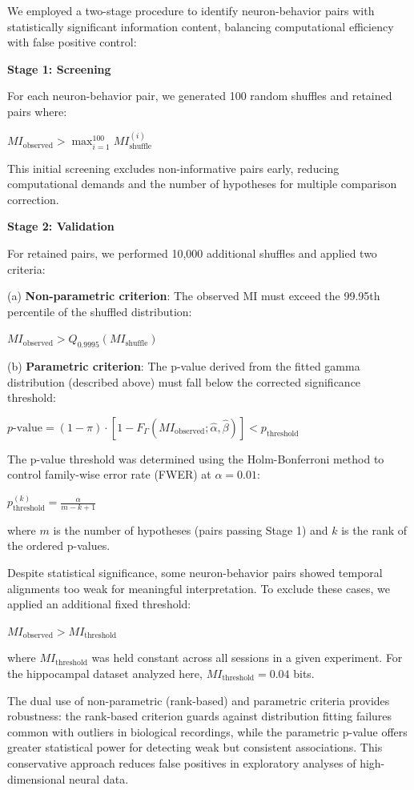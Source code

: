 We employed a two-stage procedure to identify neuron-behavior pairs with
statistically significant information content, balancing computational efficiency
with false positive control:

\textbf{Stage 1: Screening}

For each neuron-behavior pair, we generated 100 random shuffles and retained pairs
where:

$MI_{\text{observed}} > \max_{i=1}^{100} MI_{\text{shuffle}}^{(i)}$

This initial screening excludes non-informative pairs early, reducing computational
demands and the number of hypotheses for multiple comparison correction.

\textbf{Stage 2: Validation}

For retained pairs, we performed 10,000 additional shuffles and applied two
criteria:

(a) \textbf{Non-parametric criterion}: The observed MI must exceed the 99.95th percentile
of the shuffled distribution:

$MI_{\text{observed}} > Q_{0.9995}(MI_{\text{shuffle}})$

(b) \textbf{Parametric criterion}: The p-value derived from the fitted gamma
distribution (described above) must fall below the corrected significance threshold:

$p\text{-value} = (1 - \pi) \cdot [1 - F_\Gamma(MI_{\text{observed}}; \hat{\alpha}, \hat{\beta})]
< p_{\text{threshold}}$

The p-value threshold was determined using the Holm-Bonferroni method to control
family-wise error rate (FWER) at $\alpha = 0.01$:

$p_{\text{threshold}}^{(k)} = \frac{\alpha}{m - k + 1}$

where $m$ is the number of hypotheses (pairs passing Stage 1) and $k$ is the rank of
the ordered p-values.

Despite statistical significance, some neuron-behavior pairs showed temporal
alignments too weak for meaningful interpretation. To exclude these cases, we
applied an additional fixed threshold:

$MI_{\text{observed}} > MI_{\text{threshold}}$

where $MI_{\text{threshold}}$ was held constant across all sessions in a given
experiment. For the hippocampal dataset analyzed here,
$MI_{\text{threshold}} = 0.04$ bits.

The dual use of non-parametric (rank-based) and parametric criteria provides
robustness: the rank-based criterion guards against distribution fitting failures
common with outliers in biological recordings, while the parametric p-value offers
greater statistical power for detecting weak but consistent associations.
This conservative approach reduces false positives in exploratory
analyses of high-dimensional neural data.

